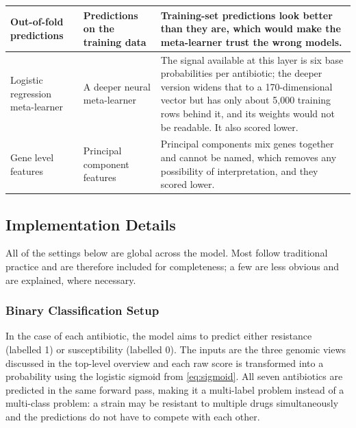 \documentclass[journal]{IEEEtran}
\begin{document}
\begin{table}[!tb]
\begin{tabular}{|>{\raggedright\arraybackslash}p{3.2cm}|>{\raggedright\arraybackslash}p{3.4cm}|>{\raggedright\arraybackslash}p{9.6cm}|}
Out-of-fold predictions & Predictions on the training data & Training-set predictions look better than they are, which would make the meta-learner trust the wrong models. \\ \hline
Logistic regression meta-learner & A deeper neural meta-learner & The signal available at this layer is six base probabilities per antibiotic; the deeper version widens that to a 170-dimensional vector but has only about 5{,}000 training rows behind it, and its weights would not be readable. It also scored lower. \\ \hline
Gene level features & Principal component features & Principal components mix genes together and cannot be named, which removes any possibility of interpretation, and they scored lower. \\ \hline
\end{tabular}
\renewcommand{\arraystretch}{1.0}
\end{table}
\fi

\subsection{Implementation Details}
\label{subsec:common_framework}

All of the settings below are global across the model. Most follow traditional
practice and are therefore included for completeness; a few are less obvious and are
explained, where necessary.

\subsubsection{Binary Classification Setup}
In the case of each antibiotic, the model aims to predict either resistance (labelled
1) or susceptibility (labelled 0). The inputs are the three genomic views discussed
in the top-level overview and each raw score is transformed into a probability using
the logistic sigmoid from \eqref{eq:sigmoid}. All seven antibiotics are
predicted in the same forward pass, making it a multi-label problem instead of a
multi-class problem: a strain may be resistant to multiple drugs simultaneously and
the predictions do not have to compete with each other.
\end{document}
